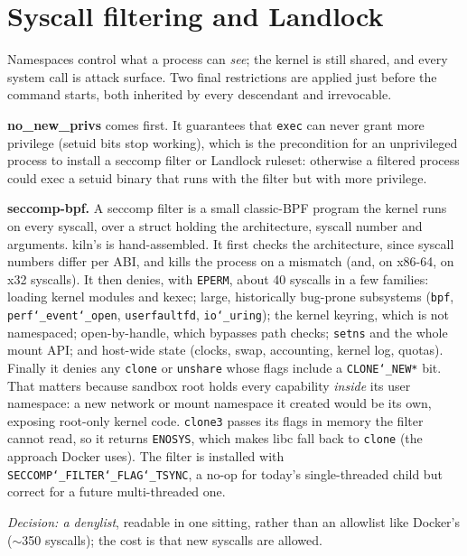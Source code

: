 \documentclass[10pt,letterpaper]{article}
\newcommand{\code}[1]{\texttt{#1}}
\newcommand{\us}{\char`\_}
\begin{document}
\section{Syscall filtering and Landlock}

Namespaces control what a process can \emph{see}; the kernel is still shared, and
every system call is attack surface. Two final restrictions are applied just
before the command starts, both inherited by every descendant and irrevocable.

\textbf{no\_new\_privs} comes first. It guarantees that \code{exec} can never grant
more privilege (setuid bits stop working), which is the precondition for an
unprivileged process to install a seccomp filter or Landlock ruleset: otherwise a
filtered process could exec a setuid binary that runs with the filter but with
more privilege.

\textbf{seccomp-bpf.} A seccomp filter is a small classic-BPF program the kernel
runs on every syscall, over a struct holding the architecture, syscall number and
arguments. kiln's is hand-assembled. It first checks the architecture, since
syscall numbers differ per ABI, and kills the process on a mismatch (and, on
x86-64, on x32 syscalls). It then denies, with \code{EPERM}, about 40 syscalls in
a few families: loading kernel modules and kexec; large, historically bug-prone
subsystems (\code{bpf}, \code{perf\us{}event\us{}open}, \code{userfaultfd},
\code{io\us{}uring}); the kernel keyring, which is not namespaced;
open-by-handle, which bypasses path checks; \code{setns} and the whole mount API;
and host-wide state (clocks, swap, accounting, kernel log, quotas). Finally it
denies any \code{clone} or \code{unshare} whose flags include a
\code{CLONE\us{}NEW*} bit. That matters because sandbox root holds every capability
\emph{inside} its user namespace: a new network or mount namespace it created
would be its own, exposing root-only kernel code. \code{clone3} passes its flags
in memory the filter cannot read, so it returns \code{ENOSYS}, which makes libc
fall back to \code{clone} (the approach Docker uses). The filter is installed
with \code{SECCOMP\us{}FILTER\us{}FLAG\us{}TSYNC}, a no-op for today's
single-threaded child but correct for a future multi-threaded one.

\emph{Decision: a denylist}, readable in one sitting, rather than an allowlist
like Docker's ($\sim$350 syscalls); the cost is that new syscalls are allowed.
\end{document}
